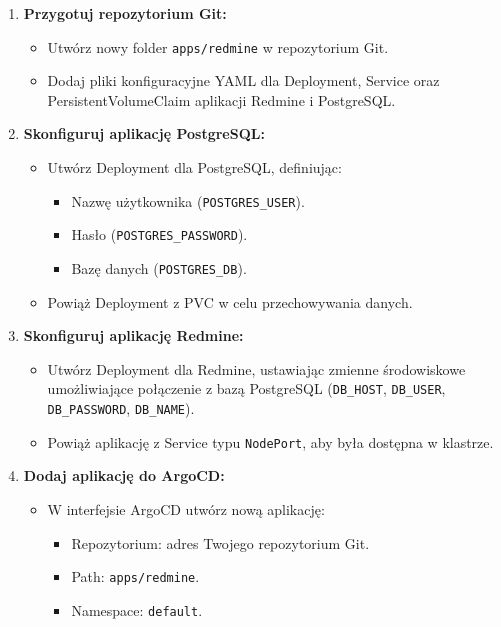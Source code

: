 \documentclass{article}
\begin{document}
\begin{enumerate}
    \item \textbf{Przygotuj repozytorium Git:}
    \begin{itemize}
        \item Utwórz nowy folder \texttt{apps/redmine} w repozytorium Git.
        \item Dodaj pliki konfiguracyjne YAML dla Deployment, Service oraz PersistentVolumeClaim aplikacji Redmine i PostgreSQL.
    \end{itemize}

    \item \textbf{Skonfiguruj aplikację PostgreSQL:}
    \begin{itemize}
        \item Utwórz Deployment dla PostgreSQL, definiując:
        \begin{itemize}
            \item Nazwę użytkownika (\texttt{POSTGRES\_USER}).
            \item Hasło (\texttt{POSTGRES\_PASSWORD}).
            \item Bazę danych (\texttt{POSTGRES\_DB}).
        \end{itemize}
        \item Powiąż Deployment z PVC w celu przechowywania danych.
    \end{itemize}

    \item \textbf{Skonfiguruj aplikację Redmine:}
    \begin{itemize}
        \item Utwórz Deployment dla Redmine, ustawiając zmienne środowiskowe umożliwiające połączenie z bazą PostgreSQL (\texttt{DB\_HOST}, \texttt{DB\_USER}, \texttt{DB\_PASSWORD}, \texttt{DB\_NAME}).
        \item Powiąż aplikację z Service typu \texttt{NodePort}, aby była dostępna w klastrze.
    \end{itemize}

    \item \textbf{Dodaj aplikację do ArgoCD:}
    \begin{itemize}
        \item W interfejsie ArgoCD utwórz nową aplikację:
        \begin{itemize}
            \item Repozytorium: adres Twojego repozytorium Git.
            \item Path: \texttt{apps/redmine}.
            \item Namespace: \texttt{default}.
        \end{itemize}
    \end{itemize}


\end{enumerate}
\end{document}
